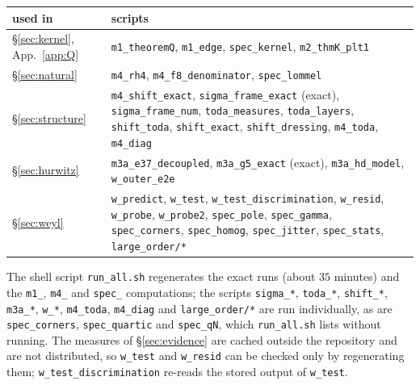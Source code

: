 \begin{center}
\small
\begin{tabular}{lp{10cm}}
\toprule
used in & scripts\\
\midrule
\S\ref{sec:kernel}, App.~\ref{app:Q} & \texttt{m1\_theoremQ}, \texttt{m1\_edge}, \texttt{spec\_kernel}, \texttt{m2\_thmK\_plt1}\\
\S\ref{sec:natural} & \texttt{m4\_rh4}, \texttt{m4\_f8\_denominator}, \texttt{spec\_lommel}\\
\S\ref{sec:structure} & \texttt{m4\_shift\_exact}, \texttt{sigma\_frame\_exact} (exact), \texttt{sigma\_frame\_num}, \texttt{toda\_measures},
  \texttt{toda\_layers}, \texttt{shift\_toda}, \texttt{shift\_exact}, \texttt{shift\_dressing}, \texttt{m4\_toda}, \texttt{m4\_diag}\\
\S\ref{sec:hurwitz} & \texttt{m3a\_e37\_decoupled}, \texttt{m3a\_g5\_exact} (exact), \texttt{m3a\_hd\_model}, \texttt{w\_outer\_e2e}\\
\S\ref{sec:weyl} & \texttt{w\_predict}, \texttt{w\_test}, \texttt{w\_test\_discrimination}, \texttt{w\_resid}, \texttt{w\_probe}, \texttt{w\_probe2}, \texttt{spec\_pole},
  \texttt{spec\_gamma}, \texttt{spec\_corners}, \texttt{spec\_homog}, \texttt{spec\_jitter}, \texttt{spec\_stats}, \texttt{large\_order/*}\\
\bottomrule
\end{tabular}
\end{center}
The shell script \texttt{run\_all.sh} regenerates the exact runs (about $35$ minutes) and the \texttt{m1\_}, \texttt{m4\_} and
\texttt{spec\_} computations; the scripts \texttt{sigma\_*}, \texttt{toda\_*}, \texttt{shift\_*}, \texttt{m3a\_*}, \texttt{w\_*}, \texttt{m4\_toda},
\texttt{m4\_diag} and \texttt{large\_order/*} are run individually, as are \texttt{spec\_corners}, \texttt{spec\_quartic} and
\texttt{spec\_qN}, which \texttt{run\_all.sh} lists without running. The measures of \S\ref{sec:evidence} are cached outside the repository
and are not distributed, so \texttt{w\_test} and \texttt{w\_resid} can be checked only by regenerating them; \texttt{w\_test\_discrimination}
re-reads the stored output of \texttt{w\_test}.
